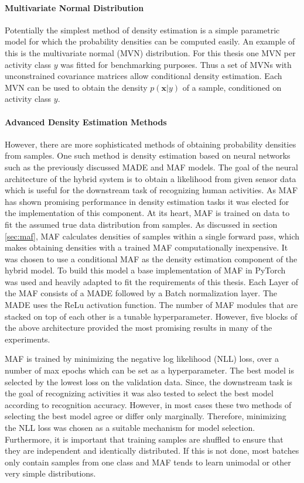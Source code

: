\documentclass[11pt,titlepage,oneside,openany]{book}
\begin{document}
\paragraph{Multivariate Normal Distribution}
Potentially the simplest method of density estimation is a simple parametric model for which the probability densities can be computed easily. An example of this is the multivariate normal (MVN) distribution. For this thesis one MVN per activity class $y$ was fitted for benchmarking purposes. Thus a set of MVNs with unconstrained covariance matrices allow conditional density estimation. Each MVN can be used to obtain the density $p(\pmb{x}|y)$ of a sample, conditioned on activity class $y$.

\paragraph{Advanced Density Estimation Methods}
However, there are more sophisticated methods of obtaining probability densities from samples. One such method is density estimation based on neural networks such as the previously discussed MADE and MAF models. The goal of the neural architecture of the hybrid system is to obtain a likelihood from given sensor data which is useful for the downstream task of recognizing human activities. As MAF has shown promising performance in density estimation tasks \cite{kobyzev_normalizing_2021} it was elected for the implementation of this component. At its heart, MAF is trained on data to fit the assumed true data distribution from samples. As discussed in section \ref{sec:maf}, MAF calculates densities of samples within a single forward pass, which makes obtaining densities with a trained MAF computationally inexpensive. It was chosen to use a conditional MAF as the density estimation component of the hybrid model. To build this model a base implementation of MAF in PyTorch \cite{kostrikov_pytorch-flows_2022} was used and heavily adapted to fit the requirements of this thesis. Each Layer of the MAF consists of a MADE followed by a Batch normalization layer. The MADE uses the ReLu activation function. The number of MAF modules that are stacked on top of each other is a tunable hyperparameter. However, five blocks of the above architecture provided the most promising results in many of the experiments.

MAF is trained by minimizing the negative log likelihood (NLL) loss, over a number of max epochs which can be set as a hyperparameter. The best model is selected by the lowest loss on the validation data. Since, the downstream task is the goal of recognizing activities it was also tested to select the best model according to recognition accuracy. However, in most cases these two methods of selecting the best model agree or differ only marginally. Therefore, minimizing the NLL loss was chosen as a suitable mechanism for model selection. Furthermore, it is important that training samples are shuffled to ensure that they are independent and identically distributed. If this is not done, most batches only contain samples from one class and MAF tends to learn unimodal or other very simple distributions.
\end{document}
